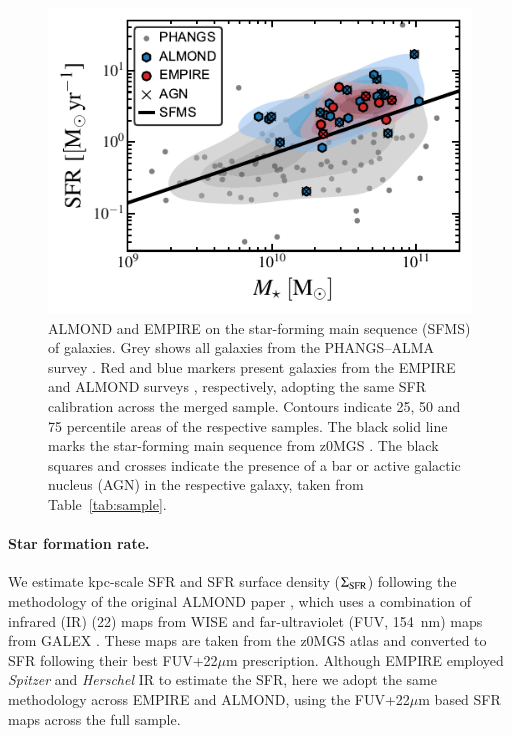\documentclass[letter, longauth]{aa} %
\begin{document}
\begin{figure}
\centering
\includegraphics[width=\columnwidth]{Figures/ALMOND+EMPIRE_SFMS_compressed_v2.pdf}
\caption{ALMOND and EMPIRE on the star-forming main sequence (SFMS) of galaxies.
Grey shows all galaxies from the PHANGS--ALMA survey \citep{Leroy2021b}.
Red and blue markers present galaxies from the EMPIRE \citep{Jimenez-Donaire2019} and ALMOND surveys \citep{Neumann2023a}, respectively, adopting the same SFR calibration across the merged sample.
Contours indicate 25, 50 and 75 percentile areas of the respective samples.
The black solid line marks the star-forming main sequence from z0MGS \citep{Leroy2019}.
The black squares and crosses indicate the presence of a bar or active galactic nucleus (AGN) in the respective galaxy, taken from Table~\ref{tab:sample}.
}
\label{fig:sfms}
\end{figure}

\paragraph{Star formation rate.}
We estimate kpc-scale SFR and SFR surface density ($\Sigma_{\rm SFR}$) following the methodology of the original ALMOND paper \citep{Neumann2023a}, which uses a combination of infrared (IR) (\SI{22}{\micron}) maps from WISE \citep{Wright2010} and far-ultraviolet (FUV, \SI{154}{nm}) maps from GALEX \citep{Martin2005}. These maps are taken from the z0MGS atlas \citep{Leroy2019} and converted to SFR following their best FUV+22$\mu$m prescription. Although EMPIRE employed \textit{Spitzer} and \textit{Herschel} IR to estimate the SFR, here we adopt the same methodology across EMPIRE and ALMOND, using the FUV+22$\mu$m based SFR maps across the full sample.
\end{document}
